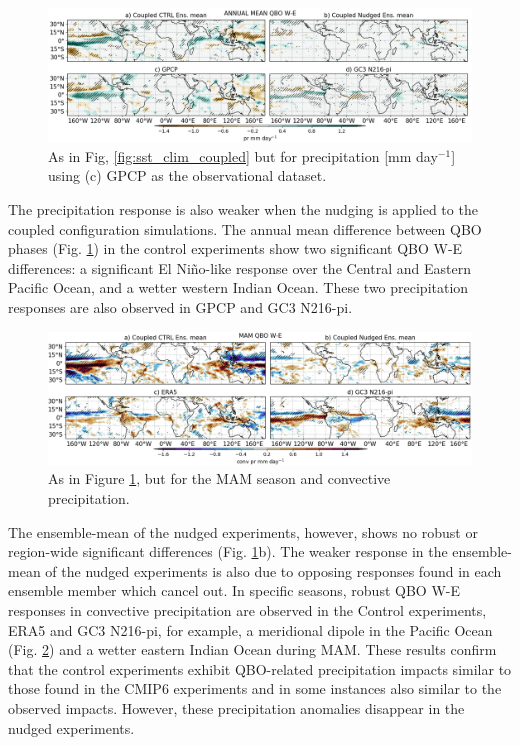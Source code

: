 \begin{figure}[t!]
\centering
 \includegraphics[width=\linewidth]{figures/prseasonal_climqbowqboe.png}
\caption[Annual mean SST response to the QBO in coupled nudged experiments]{ As in Fig, \ref{fig:sst_clim_coupled} but for precipitation [mm day$^{-1}$] using (c) GPCP as the observational dataset.}
\label{fig:pr_clim_coupled}
\end{figure}

The precipitation response is also weaker when the nudging is applied to the coupled 
configuration simulations. The annual mean difference between QBO phases (Fig. \ref{fig:pr_clim_coupled}) in the control experiments show two significant QBO W-E differences: a significant El Niño-like response over the Central and Eastern Pacific Ocean, and a wetter western Indian Ocean. These two precipitation responses are also observed in GPCP and GC3 N216-pi. 

\begin{figure}[t!]
\centering
 \includegraphics[width=\linewidth]{figures/conv_prseasonal_mamqbowqboe.png}
\caption[SST response in DJF to the QBO in coupled nudged experiments]{ As in Figure \ref{fig:pr_clim_coupled}, but for the MAM season and convective precipitation.}
\label{fig:pr_mam_coupled}
\end{figure}

The ensemble-mean of the nudged experiments, however, shows no robust or region-wide significant differences (Fig. \ref{fig:pr_clim_coupled}b). The weaker response in the ensemble-mean of the nudged experiments is also due to opposing responses found in each ensemble member which cancel out. In specific seasons, robust QBO W-E responses in convective precipitation are observed in the Control experiments, ERA5 and GC3 N216-pi, for example, a meridional dipole in the Pacific Ocean (Fig. \ref{fig:pr_mam_coupled}) and a wetter eastern Indian Ocean during MAM. These results confirm that the control experiments exhibit QBO-related precipitation impacts similar to those found in the CMIP6 experiments and in some instances also similar to the observed impacts. However, these precipitation anomalies disappear in the nudged experiments. 


